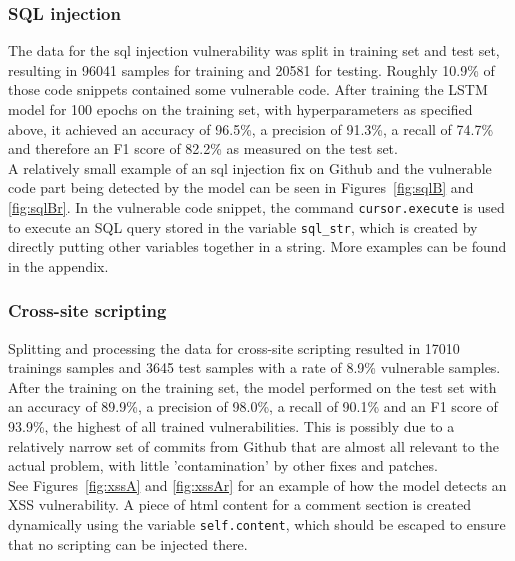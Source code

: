 \documentclass[
a4paper,
pagesize,
pdftex,
12pt,
twoside, %
BCOR=5mm, %
ngerman,
fleqn,
final,
]{scrartcl}
\begin{document}
	\subsubsection{SQL injection}
	The data for the sql injection vulnerability was split in training set and test set, resulting in 96041 samples for training and 20581 for testing. Roughly 10.9\% of those code snippets contained some vulnerable code. After training the LSTM model for 100 epochs on the training set, with hyperparameters as specified above, it achieved an accuracy of 96.5\%, a precision of 91.3\%, a recall of 74.7\% and therefore an F1 score of 82.2\% as measured on the test set.\\
	A relatively small example of an sql injection fix on Github and the vulnerable code part being detected by the model can be seen in Figures~\ref{fig:sqlB} and \ref{fig:sqlBr}. In the vulnerable code snippet, the command \texttt{cursor.execute} is used to execute an SQL query stored in the variable \texttt{sql\_str}, which is created by directly putting other variables together in a string. More examples can be found in the appendix.
	
	
	\subsubsection{Cross-site scripting}
	Splitting and processing the data for cross-site scripting resulted in 17010 trainings samples and 3645 test samples with a rate of 8.9\% vulnerable samples. After the training on the training set, the model performed on the test set with an accuracy of 89.9\%, a precision of 98.0\%, a recall of 90.1\% and an F1 score of 93.9\%, the highest of all trained vulnerabilities. This is possibly due to a relatively narrow set of commits from Github that are almost all relevant to the actual problem, with little 'contamination' by other fixes and patches.\\
	See Figures~\ref{fig:xssA} and \ref{fig:xssAr} for an example of how the model detects an XSS vulnerability. A piece of html content for a comment section is created dynamically using the variable \texttt{self.content}, which should be escaped to ensure that no scripting can be injected there.
	
\end{document}
